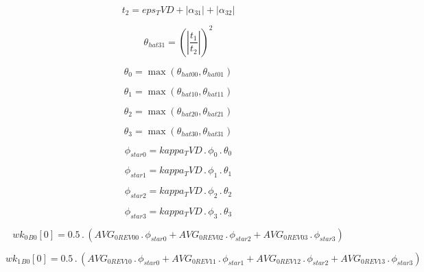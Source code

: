 \documentclass{article}
\begin{document}
\begin{dmath}t_{2} = eps_TVD + \left|{\alpha_{31}}\right| + \left|{\alpha_{32}}\right|\end{dmath}

\begin{dmath}\theta_{hat 31} = \left(\left|{\frac{t_{1}}{t_{2}}}\right| \right)^{2}\end{dmath}

\begin{dmath}\theta_{0} = \max\left(\theta_{hat 00}, \theta_{hat 01}\right)\end{dmath}

\begin{dmath}\theta_{1} = \max\left(\theta_{hat 10}, \theta_{hat 11}\right)\end{dmath}

\begin{dmath}\theta_{2} = \max\left(\theta_{hat 20}, \theta_{hat 21}\right)\end{dmath}

\begin{dmath}\theta_{3} = \max\left(\theta_{hat 30}, \theta_{hat 31}\right)\end{dmath}

\begin{dmath}\phi_{star 0} = kappa_TVD \,.\, \phi_{0} \,.\, \theta_{0}\end{dmath}

\begin{dmath}\phi_{star 1} = kappa_TVD \,.\, \phi_{1} \,.\, \theta_{1}\end{dmath}

\begin{dmath}\phi_{star 2} = kappa_TVD \,.\, \phi_{2} \,.\, \theta_{2}\end{dmath}

\begin{dmath}\phi_{star 3} = kappa_TVD \,.\, \phi_{3} \,.\, \theta_{3}\end{dmath}

\begin{dmath}{wk_{0}{_{B0}}}[{0}] = 0.5 \,.\, \left(AVG_{0 REV 00} \,.\, \phi_{star 0} + AVG_{0 REV 02} \,.\, \phi_{star 2} + AVG_{0 REV 03} \,.\, \phi_{star 3}\right)\end{dmath}

\begin{dmath}{wk_{1}{_{B0}}}[{0}] = 0.5 \,.\, \left(AVG_{0 REV 10} \,.\, \phi_{star 0} + AVG_{0 REV 11} \,.\, \phi_{star 1} + AVG_{0 REV 12} \,.\, \phi_{star 2} + AVG_{0 REV 13} \,.\, \phi_{star 3}\right)\end{dmath}
\end{document}
